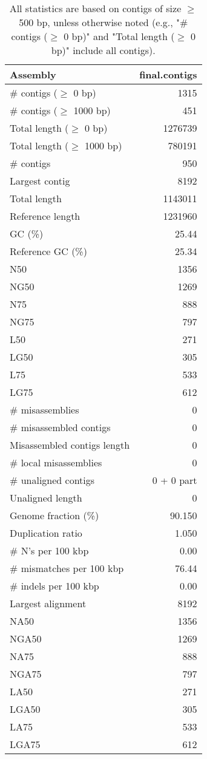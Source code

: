 \documentclass[12pt,a4paper]{article}
\begin{document}
\begin{table}[ht]
\begin{center}
\caption{All statistics are based on contigs of size $\geq$ 500 bp, unless otherwise noted (e.g., "\# contigs ($\geq$ 0 bp)" and "Total length ($\geq$ 0 bp)" include all contigs).}
\begin{tabular}{|l*{1}{|r}|}
\hline
Assembly & final.contigs \\ \hline
\# contigs ($\geq$ 0 bp) & 1315 \\ \hline
\# contigs ($\geq$ 1000 bp) & 451 \\ \hline
Total length ($\geq$ 0 bp) & 1276739 \\ \hline
Total length ($\geq$ 1000 bp) & 780191 \\ \hline
\# contigs & 950 \\ \hline
Largest contig & 8192 \\ \hline
Total length & 1143011 \\ \hline
Reference length & 1231960 \\ \hline
GC (\%) & 25.44 \\ \hline
Reference GC (\%) & 25.34 \\ \hline
N50 & 1356 \\ \hline
NG50 & 1269 \\ \hline
N75 & 888 \\ \hline
NG75 & 797 \\ \hline
L50 & 271 \\ \hline
LG50 & 305 \\ \hline
L75 & 533 \\ \hline
LG75 & 612 \\ \hline
\# misassemblies & 0 \\ \hline
\# misassembled contigs & 0 \\ \hline
Misassembled contigs length & 0 \\ \hline
\# local misassemblies & 0 \\ \hline
\# unaligned contigs & 0 + 0 part \\ \hline
Unaligned length & 0 \\ \hline
Genome fraction (\%) & 90.150 \\ \hline
Duplication ratio & 1.050 \\ \hline
\# N's per 100 kbp & 0.00 \\ \hline
\# mismatches per 100 kbp & 76.44 \\ \hline
\# indels per 100 kbp & 0.00 \\ \hline
Largest alignment & 8192 \\ \hline
NA50 & 1356 \\ \hline
NGA50 & 1269 \\ \hline
NA75 & 888 \\ \hline
NGA75 & 797 \\ \hline
LA50 & 271 \\ \hline
LGA50 & 305 \\ \hline
LA75 & 533 \\ \hline
LGA75 & 612 \\ \hline
\end{tabular}
\end{center}
\end{table}
\end{document}
